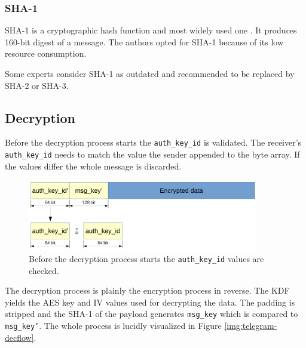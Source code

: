 \documentclass[thesis=M,english]{FITthesis}[2012/10/20]
\begin{document}
\subsubsection{SHA-1}

SHA-1 is a cryptographic hash function and most widely used one \cite{understanding-crypto}. It produces 160-bit digest of a message. The authors opted for SHA-1 because of its low resource consumption.

Some experts consider SHA-1 as outdated and recommended to be replaced by SHA-2 or SHA-3. %

\subsection{Decryption}\label{crypto-regular-dec}

Before the decryption process starts the \texttt{auth\_key\_id} is validated. The receiver's \texttt{auth\_key\_id} needs to match the value the sender appended to the byte array. If the values differ the whole message is discarded.

\begin{figure}[htb]
	\centering
	\includegraphics[width=0.9\textwidth]{mtproto-auth-key.pdf}
	\caption{Before the decryption process starts the \texttt{auth\_key\_id} values are checked.}
	\label{img:crypto-regular-dec}
\end{figure}

The decryption process is plainly the encryption process in reverse. The KDF yields the AES key and IV values used for decrypting the data. The padding is stripped and the SHA-1 of the payload generates \texttt{msg\_key} which is compared to \texttt{msg\_key'}. The whole process is lucidly visualized in Figure \ref{img:telegram-decflow}.
\end{document}
